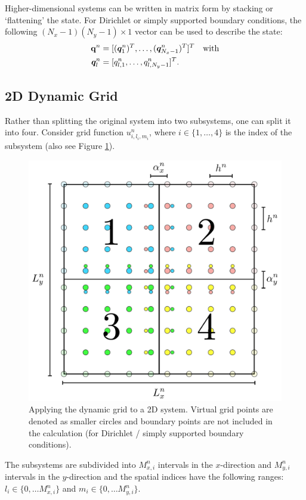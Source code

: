 \documentclass[fleqn]{jaes}
\begin{document}
Higher-dimensional systems can be written in matrix form by stacking or `flattening' the state. For Dirichlet or simply supported boundary conditions, the following $(N_x-1)(N_y-1)\times 1$ vector can be used to describe the state:
\begin{equation}\label{eq:stackedQ}
    \begin{aligned}
        \q^n &= [(\qq_{1}^n)^T, \hdots, (\qq_{N_x-1}^n)^T]^T \quad \text{with}\\
        \qq_l^n &= [q_{l, 1}^n, \hdots, q_{l, N_y-1}^n ]^T.
    \end{aligned}
\end{equation}

\subsection{2D Dynamic Grid}
Rather than splitting the original system into two subsystems, one can split it into four. Consider grid function $u_{i, l_i, m_i}^n$, where $i\in\{1, \hdots, 4\}$ is the index of the subsystem (also see Figure \ref{fig:2DGrid}). 
\begin{figure}[b]
    \centering
    \includegraphics[width=\columnwidth]{2DDynamicGrid.pdf}
    \caption{Applying the dynamic grid to a 2D system. Virtual grid points are denoted as smaller circles and boundary points are not included in the calculation (for Dirichlet / simply supported boundary conditions).
    }
    \label{fig:2DGrid}
\end{figure}
%
The subsystems are subdivided into $M_{x,i}^n$ intervals in the $x$-direction and $M_{y,i}^n$ intervals in the $y$-direction and the spatial indices have the following ranges: $l_i \in\{0, \hdots M_{x,i}^n\}$ and $m_i \in\{0, \hdots M_{y,i}^n\}$. 
\end{document}
